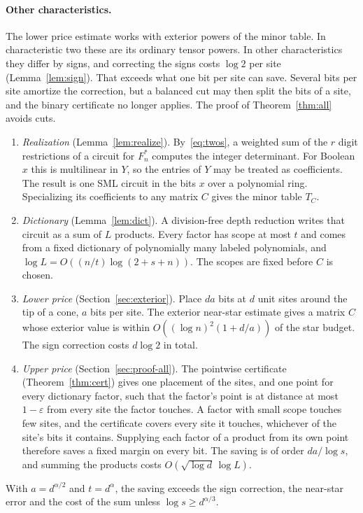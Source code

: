 \documentclass[11pt]{article}
\theoremstyle{remark}
\begin{document}
\paragraph{Other characteristics.}
The lower price estimate works with exterior powers of the minor table.
In characteristic two these are its ordinary tensor powers. In other
characteristics they differ by signs, and correcting the signs costs
\(\log2\) per site (Lemma~\ref{lem:sign}). That exceeds what one bit per
site can save. Several bits per site amortize the correction, but a
balanced cut may then split the bits of a site, and the binary
certificate no longer applies. The proof of Theorem~\ref{thm:all} avoids
cuts.
\begin{enumerate}
\item \emph{Realization} (Lemma~\ref{lem:realize}). By~\eqref{eq:twos}, a
weighted sum of the \(r\) digit restrictions of a circuit for \(F^*_n\)
computes the integer determinant. For Boolean \(x\) this is multilinear
in \(Y\), so the entries of \(Y\) may be treated as coefficients. The
result is one SML circuit in the bits \(x\) over a polynomial ring.
Specializing its coefficients to any matrix \(C\) gives the minor table
\(T_C\).
\item \emph{Dictionary} (Lemma~\ref{lem:dict}). A division-free depth
reduction writes that circuit as a sum of \(L\) products. Every factor has
scope at most \(t\) and comes from a fixed dictionary of polynomially many
labeled polynomials, and \(\log L=O((n/t)\log(2+s+n))\). The scopes are
fixed before \(C\) is chosen.
\item \emph{Lower price} (Section~\ref{sec:exterior}). Place \(da\)
bits at \(d\) unit sites around the tip of a cone, \(a\) bits per site.
The exterior near-star estimate \cite[Theorem 8.1]{hc} gives a matrix
\(C\) whose exterior value is within \(O((\log n)^2(1+d/a))\) of the star
budget. The sign correction costs \(d\log2\) in total.
\item \emph{Upper price} (Section~\ref{sec:proof-all}). The pointwise
certificate (Theorem~\ref{thm:cert}) gives one placement of the sites,
and one point for every dictionary factor, such that the factor's point
is at distance at most \(1-\varepsilon\) from every site the factor
touches. A factor with small scope touches few sites, and the certificate
covers every site it touches, whichever of the site's bits it contains.
Supplying each factor of a product from its own point therefore saves a
fixed margin on every bit. The saving is of order \(da/\log s\), and
summing the products costs \(O(\sqrt{\log d}\,\log L)\).
\end{enumerate}
With \(a=d^{\alpha/2}\) and \(t=d^{\alpha}\), the saving exceeds the
sign correction, the near-star error and the cost of the sum unless
\(\log s\ge d^{\alpha/3}\).
\end{document}
